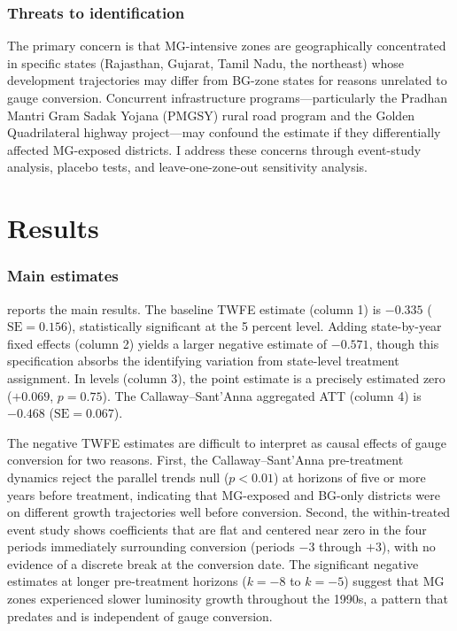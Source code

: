 \documentclass[12pt]{article}
\begin{document}
\subsubsection*{Threats to identification} The primary concern is that MG-intensive zones are geographically concentrated in specific states (Rajasthan, Gujarat, Tamil Nadu, the northeast) whose development trajectories may differ from BG-zone states for reasons unrelated to gauge conversion. Concurrent infrastructure programs---particularly the Pradhan Mantri Gram Sadak Yojana (PMGSY) rural road program and the Golden Quadrilateral highway project---may confound the estimate if they differentially affected MG-exposed districts. I address these concerns through event-study analysis, placebo tests, and leave-one-zone-out sensitivity analysis.

\section{Results}
\label{sec:results}



\subsubsection*{Main estimates}  reports the main results. The baseline TWFE estimate (column 1) is $-0.335$ ($\text{SE} = 0.156$), statistically significant at the 5 percent level. Adding state-by-year fixed effects (column 2) yields a larger negative estimate of $-0.571$, though this specification absorbs the identifying variation from state-level treatment assignment. In levels (column 3), the point estimate is a precisely estimated zero ($+0.069$, $p = 0.75$). The Callaway--Sant'Anna aggregated ATT (column 4) is $-0.468$ ($\text{SE} = 0.067$).

The negative TWFE estimates are difficult to interpret as causal effects of gauge conversion for two reasons. First, the Callaway--Sant'Anna pre-treatment dynamics reject the parallel trends null ($p < 0.01$) at horizons of five or more years before treatment, indicating that MG-exposed and BG-only districts were on different growth trajectories well before conversion. Second, the within-treated event study shows coefficients that are flat and centered near zero in the four periods immediately surrounding conversion (periods $-3$ through $+3$), with no evidence of a discrete break at the conversion date. The significant negative estimates at longer pre-treatment horizons ($k = -8$ to $k = -5$) suggest that MG zones experienced slower luminosity growth throughout the 1990s, a pattern that predates and is independent of gauge conversion.
\end{document}
